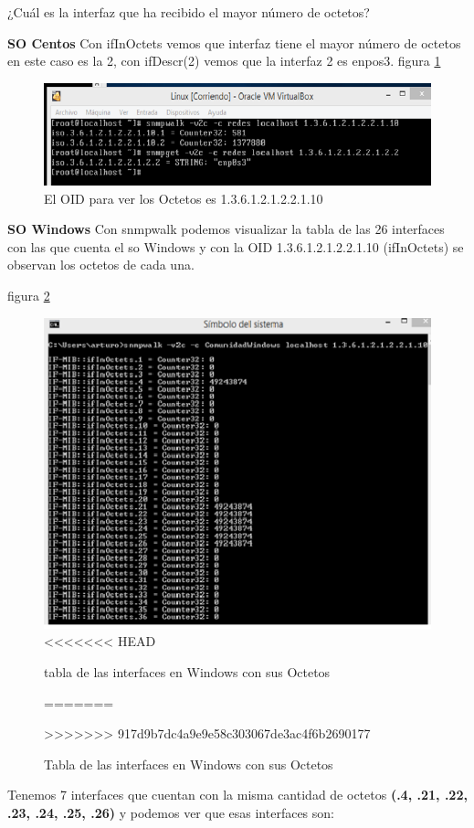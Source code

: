 \item ¿Cuál es la interfaz que ha recibido el mayor número de octetos?

\textbf{SO Centos}
Con ifInOctets vemos que interfaz tiene el mayor número de octetos en este caso es la 2, con ifDescr(2) vemos que la interfaz  2 es enpos3.
figura  \ref{image:Pregunta4O}
\FloatBarrier
\begin{figure}[htbp!]
		\centering
		    \includegraphics[width=.9 \textwidth]{../images/Pregunta4O.png} 
		\caption{El OID para ver los Octetos es 1.3.6.1.2.1.2.2.1.10}
		\label{image:Pregunta4O}
\end{figure}
\FloatBarrier

\textbf{SO Windows}
Con snmpwalk  podemos visualizar la tabla de las 26 interfaces con las que cuenta el so Windows y con la OID 1.3.6.1.2.1.2.2.1.10 (ifInOctets) se observan los octetos de cada una.

figura  \ref{image:Pregunta4W}
\FloatBarrier
\begin{figure}[htbp!]
		\centering
		    \includegraphics[width=.7 \textwidth]{../images/Pregunta4W.png} 
<<<<<<< HEAD
		\caption{tabla de las interfaces en Windows con sus Octetos}
=======
		\caption{Tabla de las interfaces en Windows con sus Octetos}
>>>>>>> 917d9b7dc4a9e9e58c303067de3ac4f6b2690177
		\label{image:Pregunta4W}
\end{figure}
\FloatBarrier

 Tenemos 7 interfaces que cuentan con la misma cantidad de octetos \textbf{(.4, .21, .22, .23, .24, .25, .26)} y podemos ver que esas interfaces son:
 
